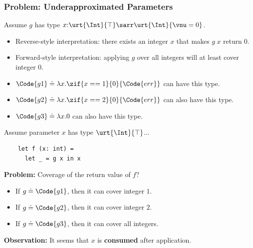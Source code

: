 \begin{frame}[fragile]
    \frametitle{Problem: Underapproximated Parameters}
Assume $g$ has type $x{:}\urt{\Int}{\top}\sarr\urt{\Int}{\vnu = 0}$.
\begin{itemize}
    \item Reverse-style interpretation: there exists an integer $x$ that makes $g\;x$ return $0$.
    \item Forward-style interpretation: applying $g$ over all integers will at least cover integer $0$.
    \item $\Code{g1} \doteq \lambda x. \zif{x == 1}{0}{\Code{err}}$ can have this type.
    \item $\Code{g2} \doteq \lambda x. \zif{x == 2}{0}{\Code{err}}$ can also have this type.
    \item $\Code{g3} \doteq \lambda x. 0$ can also have this type.
\end{itemize}

Assume parameter $x$ has type $\urt{\Int}{\top}$...
\begin{verbatim}
    let f (x: int) = 
      let _ = g x in x
\end{verbatim}
\textbf{Problem:} Coverage of the return value of $f$?
\begin{itemize}
    \item If $g \doteq \Code{g1}$, then it can cover integer $1$.
    \item If $g \doteq \Code{g2}$, then it can cover integer $2$.
    \item If $g \doteq \Code{g3}$, then it can cover all integers.
\end{itemize}

\textbf{Observation:} It seems that $x$ is \textbf{consumed} after application.

\end{frame}

